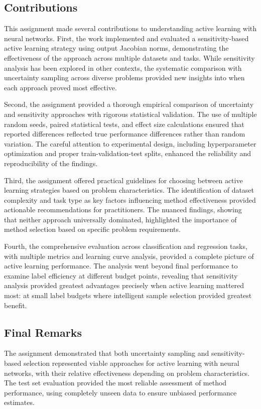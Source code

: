 \documentclass[conference]{IEEEtran}
\begin{document}
\subsection{Contributions}

This assignment made several contributions to understanding active learning with neural networks. First, the work implemented and evaluated a sensitivity-based active learning strategy using output Jacobian norms, demonstrating the effectiveness of the approach across multiple datasets and tasks. While sensitivity analysis has been explored in other contexts, the systematic comparison with uncertainty sampling across diverse problems provided new insights into when each approach proved most effective.

Second, the assignment provided a thorough empirical comparison of uncertainty and sensitivity approaches with rigorous statistical validation. The use of multiple random seeds, paired statistical tests, and effect size calculations ensured that reported differences reflected true performance differences rather than random variation. The careful attention to experimental design, including hyperparameter optimization and proper train-validation-test splits, enhanced the reliability and reproducibility of the findings.

Third, the assignment offered practical guidelines for choosing between active learning strategies based on problem characteristics. The identification of dataset complexity and task type as key factors influencing method effectiveness provided actionable recommendations for practitioners. The nuanced findings, showing that neither approach universally dominated, highlighted the importance of method selection based on specific problem requirements.

Fourth, the comprehensive evaluation across classification and regression tasks, with multiple metrics and learning curve analysis, provided a complete picture of active learning performance. The analysis went beyond final performance to examine label efficiency at different budget points, revealing that sensitivity analysis provided greatest advantages precisely when active learning mattered most: at small label budgets where intelligent sample selection provided greatest benefit.

\subsection{Final Remarks}

The assignment demonstrated that both uncertainty sampling and sensitivity-based selection represented viable approaches for active learning with neural networks, with their relative effectiveness depending on problem characteristics. The test set evaluation provided the most reliable assessment of method performance, using completely unseen data to ensure unbiased performance estimates.
\end{document}

